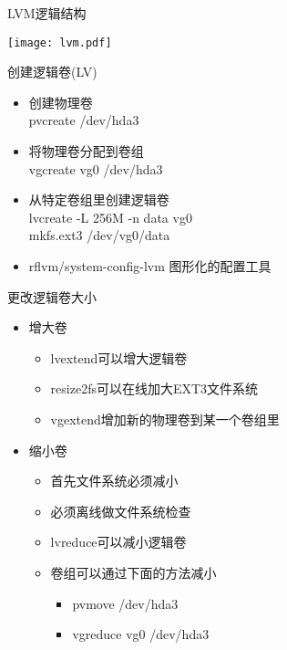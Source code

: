 \begin{frame}[plain]{LVM逻辑结构}

\texttt{[image: lvm.pdf]}
\end{frame} 

\begin{frame}{创建逻辑卷(LV)}

\begin{itemize}
\item 创建物理卷\\
pvcreate /dev/hda3
\item 将物理卷分配到卷组\\
vgcreate vg0 /dev/hda3
\item 从特定卷组里创建逻辑卷\\
lvcreate -L 256M -n data vg0\\
mkfs.ext3 /dev/vg0/data 
\item rflvm/system-config-lvm 图形化的配置工具
\end{itemize}

\end{frame} 
\begin{frame}{更改逻辑卷大小}
\begin{itemize}
\item 增大卷

\begin{itemize}
\item lvextend可以增大逻辑卷
\item resize2fs可以在线加大EXT3文件系统
\item vgextend增加新的物理卷到某一个卷组里
\end{itemize}
\item 缩小卷

\begin{itemize}
\item 首先文件系统必须减小
\item 必须\alert{离线}做文件系统检查
\item lvreduce可以减小逻辑卷
\item 卷组可以通过下面的方法减小

\begin{itemize}
\item pvmove /dev/hda3
\item vgreduce vg0 /dev/hda3
\end{itemize}
\end{itemize}
\end{itemize}

\end{frame} 


